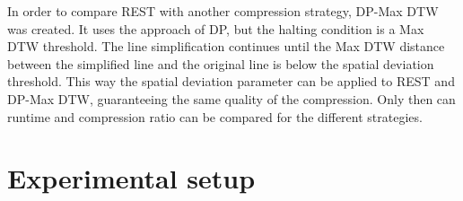 In order to compare REST with another compression strategy, DP-Max DTW was created. It uses the approach of DP, but the halting condition is a Max DTW threshold. The line simplification continues until the Max DTW distance between the simplified line and the original line is below the spatial deviation threshold. This way the spatial deviation parameter can be applied to REST and DP-Max DTW, guaranteeing the same quality of the compression. Only then can runtime and compression ratio can be compared for the different strategies.

\section{Experimental setup}


